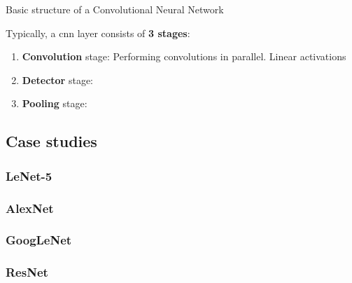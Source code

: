 %
%
%

\begin{frame}[t]{Basic structure of a Convolutional Neural Network}

    Typically, a \gls{cnn} layer
    consists of {\bf 3 stages}:
    \begin{enumerate}
        \item {\bf Convolution} stage:
           Performing convolutions in parallel. 
           Linear activations           
        \item {\bf Detector} stage:
        \item {\bf Pooling} stage:
    \end{enumerate}

\end{frame}

\subsection{Case studies}


\subsubsection{LeNet-5}

\subsubsection{AlexNet}

\subsubsection{GoogLeNet}

\subsubsection{ResNet}
